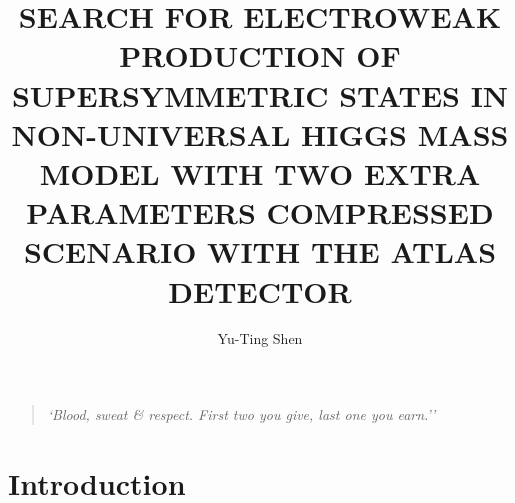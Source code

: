 \documentclass[hyperlinks]{outhesis}
\begin{document}
\author{Yu-Ting Shen}
\title{SEARCH FOR ELECTROWEAK PRODUCTION OF SUPERSYMMETRIC STATES IN NON-UNIVERSAL HIGGS MASS MODEL WITH TWO EXTRA PARAMETERS COMPRESSED SCENARIO WITH THE ATLAS DETECTOR}
\address{Norman, Oklahoma}

\begin{dedication}
    \begin{quotation}
        \raggedright{\emph{`Blood, sweat \& respect. First two you give, last one you earn.''}} \\
    \end{quotation}
\end{dedication}

\begin{acknowledgements}
    
\end{acknowledgements}

\begin{abstract}
	
\end{abstract}

\frontmatter

\maketitle

\mainmatter

\hypersetup{linkcolor=blue}


\chapter{Introduction}
\label{chapter:introduction}
\graphicspath{{figures/introduction/}}

\end{document}

